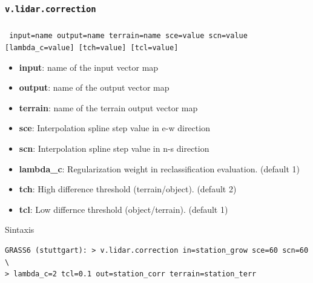 \subsubsection{\texttt{v.lidar.correction}}
\begin{frame}[fragile,shrink=5]
  \frametitle{}
  \begin{beamerboxesrounded}[shadow=true]{\textbf{}
    \texttt{ input=name  output=name  terrain=name  sce=value  scn=value 
    [lambda\_c=value]  [tch=value]  [tcl=value]}}
    \begin{itemize}
     \item \textbf{input}: name of the input vector map
     \item \textbf{output}: name of the output vector map
     \item \textbf{terrain}: name of the terrain output vector map
     \item \textbf{sce}: Interpolation spline step value in e-w direction
     \item \textbf{scn}: Interpolation spline step value in n-s direction
     \item \textbf{lambda\_c}: Regularization weight in reclassification evaluation. (default 1)
     \item \textbf{tch}: High difference threshold (terrain/object). (default 2)
     \item \textbf{tcl}: Low differnce threshold (object/terrain). (default 1)
    \end{itemize}
  \end{beamerboxesrounded}
  \begin{beamerboxesrounded}[shadow=true]{Sintaxis}
\scriptsize
\begin{verbatim}
GRASS6 (stuttgart): > v.lidar.correction in=station_grow sce=60 scn=60 \
> lambda_c=2 tcl=0.1 out=station_corr terrain=station_terr
\end{verbatim}
  \end{beamerboxesrounded}
\end{frame}
